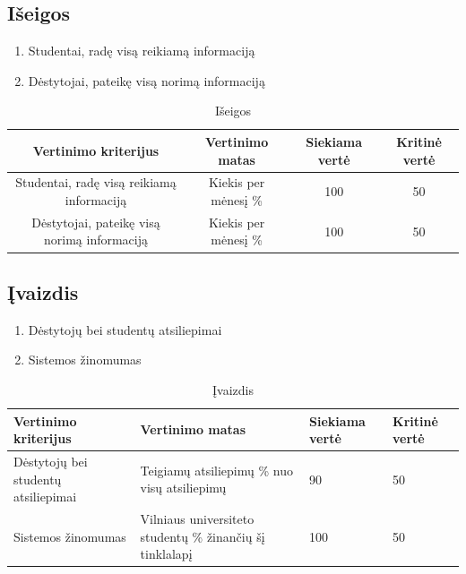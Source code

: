 \documentclass{VUMIFPSkursinis}
\begin{document}
\subsection{Išeigos}
\begin{enumerate}
	\item Studentai, radę visą reikiamą informaciją
	\item Dėstytojai, pateikę visą norimą informaciją
\end{enumerate}
\begin{table}[H]
	\centering
	\caption{Išeigos}
	{\begin{tabular}{|c|c|c|c|} \hline
			Vertinimo kriterijus & Vertinimo matas & Siekiama vertė & Kritinė vertė \\
			\hline
			Studentai, radę visą reikiamą informaciją & Kiekis per mėnesį \% & 100 & 50 \\
			\hline
			Dėstytojai, pateikę visą norimą informaciją & Kiekis per mėnesį \% & 100 & 50 \\
			\hline
	\end{tabular}}
	\label{iseigos}
\end{table}
	\subsection{Įvaizdis}
\begin{enumerate}
	\item Dėstytojų bei studentų atsiliepimai
	\item Sistemos žinomumas
\end{enumerate}
\begin{table}[H]
	\centering
	\caption{Įvaizdis}
	{\begin{tabular}{|p{5cm}|p{}|p{2cm}|p{2cm}|}\hline
			Vertinimo kriterijus & Vertinimo matas & Siekiama vertė & Kritinė vertė \\
			\hline
			Dėstytojų bei studentų atsiliepimai & Teigiamų atsiliepimų \% nuo visų atsiliepimų & 90 & 50 \\
			\hline
			Sistemos žinomumas & Vilniaus universiteto studentų \% žinančių šį tinklalapį & 100 & 50 \\
			\hline
	\end{tabular}}
	\label{ivaizdis}
\end{table}
\end{document}

